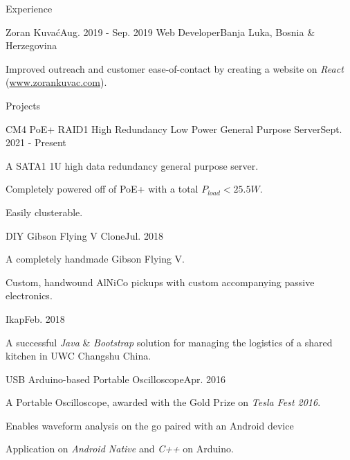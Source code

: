 \documentclass{resume}
\begin{document}
\begin{rSection}{Experience}
    \begin{rSubsection}
        {Zoran Kuva\'{c}}{Aug. 2019 - Sep. 2019}
        {Web Developer}{Banja Luka, Bosnia \& Herzegovina}
        \item Improved outreach and customer ease-of-contact by creating a
            website on \textit{React} (\url{www.zorankuvac.com}).
    \end{rSubsection}
\end{rSection}

\begin{rSection}{Projects}
    \begin{rSubsection}{CM4 PoE+ RAID1 High Redundancy Low Power General
        Purpose Server}{Sept. 2021 - Present}{}{}
        \item A SATA1 1U high data redundancy general purpose server.
        \item Completely powered off of PoE+ with a total $P_{load} <
            25.5\si{W}$.
        \item Easily clusterable.
    \end{rSubsection}

    \begin{rSubsection}{DIY Gibson Flying V Clone}{Jul. 2018}{}{}
        \item A completely handmade Gibson Flying V.
        \item Custom, handwound AlNiCo pickups with custom accompanying passive
            electronics.
    \end{rSubsection}

    \begin{rSubsection}{Ikap}{Feb. 2018}{}{}
    \item A successful \textit{Java} \& \textit{Bootstrap} solution for
            managing the logistics of a shared kitchen in UWC Changshu China.
    \end{rSubsection}

    \begin{rSubsection}{USB Arduino-based Portable Oscilloscope}{Apr. 2016}{}{}
        \item A Portable Oscilloscope, awarded with the Gold Prize on
            \textit{Tesla Fest 2016}.
        \item Enables waveform analysis on the go paired with an Android device
        \item Application on \textit{Android Native} and \textit{C++} on
            Arduino.
    \end{rSubsection}


\end{rSection}
\end{document}
